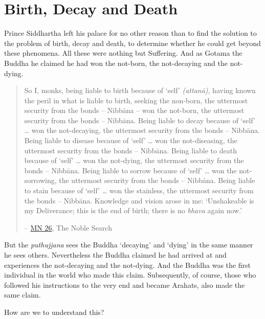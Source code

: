 \chapter{Birth, Decay and Death}

Prince Siddhartha left his palace for no other reason than to find the solution to the problem of birth, decay and death, to determine whether he could get beyond these phenomena. All these were nothing but Suffering. And as Gotama the Buddha he claimed he had won the not-born, the not-decaying and the not-dying.

\begin{quote}
So I, monks, being liable to birth because of `self' \emph{(attanā)}, having known the peril in what is liable to birth, seeking the non-born, the uttermost security from the bonds -- Nibbāna -- won the not-born, the uttermost security from the bonds -- Nibbāna. Being liable to decay because of `self' \ldots\hspace{0pt} won the not-decaying, the uttermost security from the bonds -- Nibbāna. Being liable to disease because of `self' \ldots\hspace{0pt} won the not-diseasing, the uttermost security from the bonds -- Nibbāna. Being liable to death because of `self' \ldots\hspace{0pt} won the not-dying, the uttermost security from the bonds -- Nibbāna. Being liable to sorrow because of `self' \ldots\hspace{0pt} won the not-sorrowing, the uttermost security from the bonds -- Nibbāna. Being liable to stain because of `self' \ldots\hspace{0pt} won the stainless, the uttermost security from the bonds -- Nibbāna. Knowledge and vision arose in me: `Unshakeable is my Deliverance; this is the end of birth; there is no \emph{bhava} again now.'

 -- \href{https://suttacentral.net/mn26/en/bodhi}{MN 26}, The Noble Search
\end{quote}

But the \emph{puthujjana} sees the Buddha `decaying' and `dying' in the same manner he sees others. Nevertheless the Buddha claimed he had arrived at and experiences the not-decaying and the not-dying. And the Buddha was the first individual in the world who made this claim. Subsequently, of course, those who followed his instructions to the very end and became Arahats, also made the same claim.

How are we to understand this?

